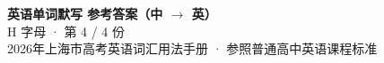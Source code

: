 \documentclass[10pt,a4paper]{article}
\begin{document}
\pagestyle{plain}

\begin{center}
{\LARGE\bfseries 英语单词默写 \quad 参考答案（中 $\to$ 英）}\\[0.22em]
{\large H 字母 · 第 4 / 4 份}\\[0.18em]
{\small 2026年上海市高考英语词汇用法手册 · 参照普通高中英语课程标准}
\end{center}

\vspace{0.2em}
\noindent{\color{rulegray}\rule{\textwidth}{0.8pt}}

\vspace{0.35em}

\vspace{0.25em}
\renewcommand{\arraystretch}{1.32}
\end{document}
